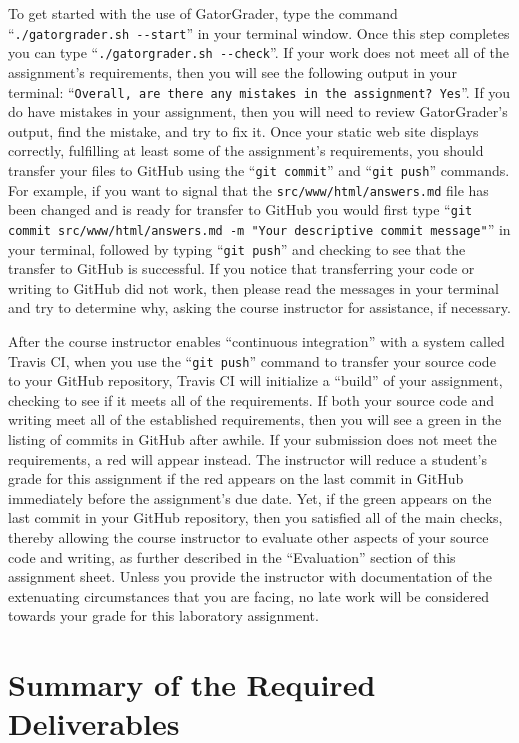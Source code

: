 \documentclass[11pt]{article}
\newcommand{\mainprogramsource}{\lstinline{src/www/html/answers.md}}
\newcommand{\gatorgraderstart}{\command{./gatorgrader.sh --start}}
\newcommand{\gatorgradercheck}{\command{./gatorgrader.sh --check}}
\newcommand{\gitcommit}{\command{git commit}}
\newcommand{\gitpush}{\command{git push}}
\newcommand{\gitcommitmainprogram}{\command{git commit src/www/html/answers.md -m "Your
descriptive commit message"}}
\newcommand{\command}[1]{``\lstinline{#1}''}
\newcommand{\step}[1]{``{#1}''}
\newcommand{\checkmark}{\ding{51}}
\newcommand{\naughtmark}{\ding{55}}
\begin{document}
To get started with the use of GatorGrader, type the command \gatorgraderstart{}
in your terminal window. Once this step completes you can type
\gatorgradercheck{}. If your work does not meet all of the assignment's
requirements, then you will see the following output in your terminal:
\command{Overall, are there any mistakes in the assignment? Yes}. If you do have
mistakes in your assignment, then you will need to review GatorGrader's output,
find the mistake, and try to fix it. Once your static web site displays
correctly, fulfilling at least some of the assignment's requirements, you should
transfer your files to GitHub using the \gitcommit{} and \gitpush{} commands.
For example, if you want to signal that the \mainprogramsource{} file has been
changed and is ready for transfer to GitHub you would first type
\gitcommitmainprogram{} in your terminal, followed by typing \gitpush{} and
checking to see that the transfer to GitHub is successful. If you notice that
transferring your code or writing to GitHub did not work, then please read the
messages in your terminal and try to determine why, asking the course instructor
for assistance, if necessary.

After the course instructor enables \step{continuous integration} with a system
called Travis CI, when you use the \gitpush{} command to transfer your source
code to your GitHub repository, Travis CI will initialize a \step{build} of your
assignment, checking to see if it meets all of the requirements. If both your
source code and writing meet all of the established requirements, then you will
see a green \checkmark{} in the listing of commits in GitHub after awhile. If
your submission does not meet the requirements, a red \naughtmark{} will appear
instead. The instructor will reduce a student's grade for this assignment if the
red \naughtmark{} appears on the last commit in GitHub immediately before the
assignment's due date. Yet, if the green \checkmark{} appears on the last commit
in your GitHub repository, then you satisfied all of the main checks, thereby
allowing the course instructor to evaluate other aspects of your source code and
writing, as further described in the \step{Evaluation} section of this
assignment sheet. Unless you provide the instructor with documentation of the
extenuating circumstances that you are facing, no late work will be considered
towards your grade for this laboratory assignment.

\section*{Summary of the Required Deliverables}
\end{document}
